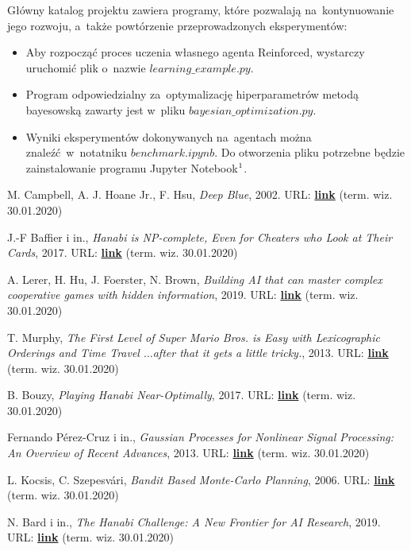 \documentclass[declaration,shortabstract,inz]{iithesis}
\begin{document}
Główny katalog projektu zawiera programy, które pozwalają na~kontynuowanie jego rozwoju, a~także powtórzenie przeprowadzonych eksperymentów:
\begin{itemize}
	\item Aby rozpocząć proces uczenia własnego agenta Reinforced, wystarczy uruchomić plik o~nazwie $learning\_example.py$.
	\item Program odpowiedzialny za~optymalizację hiperparametrów metodą bayesowską zawarty jest w~pliku $bayesian\_optimization.py$.
	\item Wyniki eksperymentów dokonywanych na~agentach można znaleźć w~notatniku $benchmark.ipynb$. Do otworzenia pliku potrzebne będzie zainstalowanie programu Jupyter Notebook$\footnote{Instrukcja instalacji programu Jupyter Notebook: \href{https://jupyter.org/install}{\textbf{link}} (term. wiz. 30.01.2020)}$.
\end{itemize}

\begin{thebibliography}{4}

 M. Campbell, A. J. Hoane Jr., F. Hsu, \textit{Deep Blue}, 2002. URL: 
\href{https://core.ac.uk/download/pdf/82416379.pdf}{\textbf{link}} (term. wiz. 30.01.2020)

 J.-F Baffier i in., \textit{Hanabi is NP-complete, Even for Cheaters who Look at Their Cards}, 2017. URL: 
\href{https://arxiv.org/pdf/1603.01911.pdf}{\textbf{link}} (term. wiz. 30.01.2020)

 A. Lerer, H. Hu, J. Foerster, N. Brown, \textit{Building AI that can master complex cooperative games with hidden information}, 2019. URL: 
\href{https://ai.facebook.com/blog/building-ai-that-can-master-complex-cooperative-games-with-hidden-information/}{\textbf{link}} (term. wiz. 30.01.2020)

 T. Murphy, \textit{The First Level of Super Mario Bros. is Easy with Lexicographic Orderings and Time Travel $\ldots$after that it gets a little tricky.}, 2013. URL: 
\href{http://www.cs.cmu.edu/~tom7/mario/mario.pdf}{\textbf{link}} (term. wiz. 30.01.2020)

 B. Bouzy, \textit{Playing Hanabi Near-Optimally}, 2017. URL: 
\href{http://helios.mi.parisdescartes.fr/~bouzy/publications/bouzy-hanabi-2017.pdf}{\textbf{link}} (term. wiz. 30.01.2020)

 Fernando Pérez-Cruz i in., \textit{Gaussian Processes for Nonlinear Signal Processing: An Overview of Recent Advances}, 2013. URL: 
\href{https://www.researchgate.net/publication/260637079_Gaussian_Processes_for_Nonlinear_Signal_Processing_An_Overview_of_Recent_Advances}{\textbf{link}} (term. wiz. 30.01.2020)

 L. Kocsis, C. Szepesvári, \textit{Bandit Based Monte-Carlo Planning}, 2006. URL: 
\href{https://link.springer.com/content/pdf/10.1007/11871842_29.pdf}{\textbf{link}} (term. wiz. 30.01.2020)

 N. Bard i in., \textit{The Hanabi Challenge: A New Frontier for AI Research}, 2019. URL: 
\href{https://arxiv.org/pdf/1902.00506.pdf}{\textbf{link}} (term. wiz. 30.01.2020)

\end{thebibliography}
\end{document}

